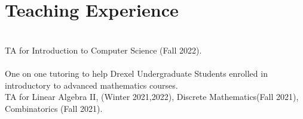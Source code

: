 \documentclass[]{deedy-resume-openfont}
\begin{document}
\begin{minipage}[t]{0.44\textwidth}

\section{Teaching Experience} 

\\
TA for Introduction to Computer Science (Fall 2022).\\
\sectionsep
{}\\
One on one tutoring to help Drexel Undergraduate Students enrolled in introductory to advanced mathematics courses.\\
TA for Linear Algebra II, (Winter 2021,2022), Discrete Mathematics(Fall 2021), Combinatorics (Fall 2021).
\sectionsep


\end{minipage}
\end{document}
